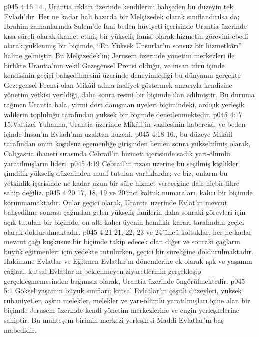 \vs p045 4:16 14., Urantia ırkları üzerinde kendilerini bahşeden bu düzeyin tek Evladı’dır. Her ne kadar hali hazırda bir Melçizedek olarak sınıflandırılsa da; İbrahim zamanlarında Salem’de fani beden hüviyeti içerisinde Urantia üzerinde kısa süreli olarak ikamet etmiş bir yükseliş fanisi olarak hizmetin görevini ebedi olarak yüklenmiş bir biçimde, “En Yüksek Unsurlar’ın sonsuz bir hizmetkârı” haline gelmiştir. Bu Melçizedek’in; Jerusem üzerinde yönetim merkezleri ile birlikte Urantia’nın vekil Gezegensel Prensi olduğu, ve insan türü içinde kendisinin geçici bahşedilmesini üzerinde deneyimlediği bu dünyanın gerçekte Gezegensel Prensi olan Mikâil adına faaliyet göstermek amacıyla kendisine yönetim yetkisi verildiği, daha sonra resmi bir biçimde ilan edilmiştir. Bu duruma rağmen Urantia hala, yirmi dört danışman üyeleri biçimindeki, ardışık yerleşik valilerin topluluğu tarafından yüksek bir biçimde denetlenmektedir.
\vs p045 4:17 15.\bibnobreakspace Vaftizci Yuhanna, Urantia üzerinde Mikâil’in vazifesinin habercisi, ve beden içinde İnsan’ın Evladı’nın uzaktan kuzeni.
\vs p045 4:18 16.\bibnobreakspace {}, bu düzeye Mikâil tarafından onun koşulsuz egemenliğe girişinden hemen sonra yükseltilmiş olarak, Caligastia ihaneti sırasında Cebrail’in hizmeti içerisinde sadık yarı\hyp{}ölümlü yaratılmışların lideri.
\vs p045 4:19 Cebrail’in rızası üzerine bu seçilmiş kişilikler şimdilik yükseliş düzeninden muaf tutulan varlıklardır; ve biz, onların bu yetkinlik içerisinde ne kadar uzun bir süre hizmet vereceğine dair hiçbir fikre sahip değiliz.
\vs p045 4:20 17, 18, 19 ve 20’inci koltuk numaraları, kalıcı bir biçimde korunmamaktadır. Onlar geçici olarak, Urantia üzerinde Evlat’ın mevcut bahşedilme sonrası çağından gelen yükseliş fanilerin daha sonraki görevleri için açık tutulan bir biçimde, on altı kalıcı üyenin hemfikir kararı tarafından geçici olarak doldurulmaktadır.
\vs p045 4:21 21, 22, 23 ve 24’üncü koltuklar, her ne kadar mevcut çağı kuşkusuz bir biçimde takip edecek olan diğer ve sonraki çağların büyük eğitmenleri için yedekte tutulurken, geçici bir süreliğine doldurulmaktadır. Hakimane Evlatlar ve Eğitmen Evlatlar’ın dönemlerine ek olarak ışık ve yaşamın çağları, kutsal Evlatlar’ın beklenmeyen ziyaretlerinin gerçekleşip gerçekleşmemesinden bağımsız olarak, Urantia üzerinde öngörülmektedir.
\vs p045 5:1 Göksel yaşamın büyük sınıfları; kutsal Evlatlar’ın çeşitli düzeyleri, yüksek ruhaniyetler, aşkın melekler, melekler ve yarı\hyp{}ölümlü yaratılmışları içine alan bir biçimde Jerusem üzerinde kendi yönetim merkezlerine ve engin yerleşkelerine sahiptir. Bu muhteşem birimin merkezi yerleşkesi Maddi Evlatlar’ın baş mabedidir.
